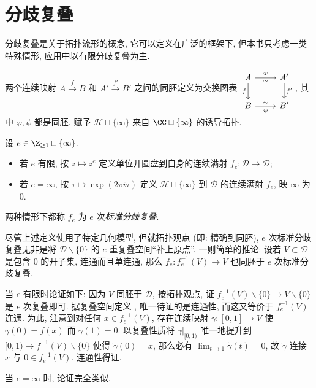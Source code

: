 \section{分歧复叠}\label{sec:branched-covering}
分歧复叠是关于拓扑流形的概念, 它可以定义在广泛的框架下, 但本书只考虑一类特殊情形, 应用中以有限分歧复叠为主.

两个连续映射 $A \xrightarrow{f} B$ 和 $A' \xrightarrow{f'} B'$ 之间的同胚定义为交换图表
$\begin{tikzcd}
	A \arrow[d, "f"'] \arrow[r, "\varphi", "\sim"'] & A' \arrow[d, "{f'}"] \\
	B \arrow[r, "\psi"', "\sim"] & B'
\end{tikzcd}$,
其中 $\varphi, \psi$ 都是同胚. 赋予 $\mathcal{H} \sqcup \{\infty\}$ 来自 $\CC \sqcup \{\infty\}$ 的诱导拓扑.

\begin{definition}
	设 $e \in \Z_{\geq 1} \sqcup \{\infty\}$.
	\begin{itemize}
		\item 若 $e$ 有限, 按 $z \mapsto z^e$ 定义单位开圆盘到自身的连续满射 $f_e: \mathcal{D} \to \mathcal{D}$;
		\item 若 $e = \infty$, 按 $\tau \mapsto \exp(2\pi i\tau)$ 定义 $\mathcal{H} \sqcup \{\infty\}$ 到 $\mathcal{D}$ 的连续满射 $f_e$, 映 $\infty$ 为 $0$.
	\end{itemize}	
	两种情形下都称 $f_e$ 为 $e$ 次\emph{标准分歧复叠}.
\end{definition}

\begin{remark}\label{rem:branched-restriction}
	尽管上述定义使用了特定几何模型, 但就拓扑观点 (即: 精确到同胚), $e$ 次标准分歧复叠无非是将 $\mathcal{D} \smallsetminus \{0\}$ 的 $e$ 重复叠空间``补上原点''. 一则简单的推论: 设若 $V \subset \mathcal{D}$ 是包含 $0$ 的开子集, 连通而且单连通, 那么 $f_e: f_e^{-1}(V) \to V$ 也同胚于 $e$ 次标准分歧复叠.
	
	当 $e$ 有限时论证如下: 因为 $V$ 同胚于 $\mathcal{D}$, 按拓扑观点, 证 $f_e^{-1}(V) \smallsetminus \{0\} \to V \smallsetminus \{0\}$ 是 $e$ 次复叠即可. 据复叠空间定义 \cite[第五章 \S 1]{You}, 唯一待证的是连通性, 而这又等价于 $f_e^{-1}(V)$ 连通. 为此, 注意到对任何 $x \in f_e^{-1}(V)$, 存在连续映射 $\gamma: [0,1] \to V$ 使 $\gamma(0) = f(x)$ 而 $\gamma(1) = 0$. 以复叠性质将 $\gamma|_{[0,1)}$ 唯一地提升到 $[0,1) \to f^{-1}(V) \smallsetminus \{0\}$ 使得 $\tilde{\gamma}(0)=x$, 那么必有 $\lim_{t \to 1} \tilde{\gamma}(t) = 0$, 故 $\tilde{\gamma}$ 连接 $x$ 与 $0 \in f_e^{-1}(V)$. 连通性得证.
	
	当 $e=\infty$ 时, 论证完全类似.
\end{remark}

